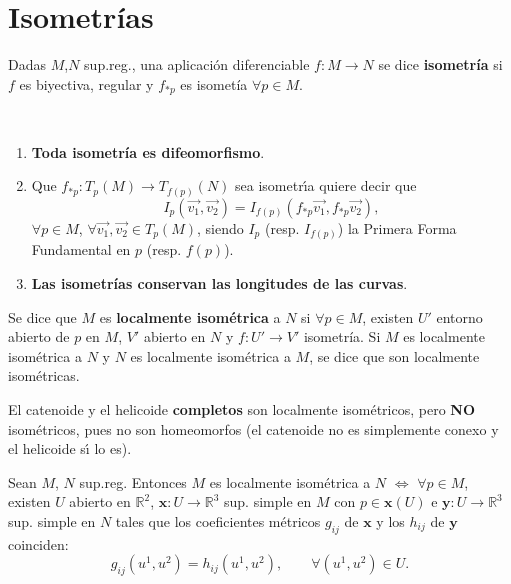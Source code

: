 \documentclass[twoside]{report}
\begin{document}
\section{Isometr\'ias}

\begin{defi}
 Dadas $M$,$N$ sup.reg., una aplicaci\'on diferenciable $f:M \longrightarrow N$ se dice \textbf{isometr\'ia} si $f$ es biyectiva, regular y  $f_{*p}$ es isomet\'ia $\forall p \in M$.
\end{defi}


\begin{nota}

\

\begin{enumerate}
\item \textbf{Toda isometr\'ia es difeomorfismo}.

\item
Que $f_{*p}: T_p (M)\rightarrow T_{f(p)}(N)$ sea isometr\'{\i}a quiere decir que $$I_p (\overrightarrow{v_1},\overrightarrow{v_2}) = I_{f(p)}(f_{*p}\overrightarrow{v_1},f_{*p}\overrightarrow{v_2}),$$ $\forall p \in M$, $\forall \overrightarrow{v_1},\overrightarrow{v_2} \in T_p(M)$, siendo $I_p$ (resp. $I_{f(p)}$) la Primera Forma Fundamental en $p$ (resp. $f(p)$).
\item \textbf{Las isometr\'ias conservan las longitudes de las curvas}.
\end{enumerate}
\end{nota}


\begin{defi}
Se dice que $M$ es \textbf{localmente isom\'etrica}
 a $N$ si $\forall p \in M$, existen $U'$ entorno abierto de $p$ en $M$, $V'$ abierto en $N$ y $f: U' \rightarrow V'$ isometr\'ia. Si $M$ es localmente isom\'etrica a $N$ y $N$ es localmente isom\'etrica a $M$, se dice que son localmente isom\'etricas.
\end{defi}


\begin{ej}
El catenoide y el helicoide \textbf{completos} son localmente isom\'etricos, pero \textbf{NO} isom\'etricos, pues no son homeomorfos (el catenoide no es simplemente conexo y el helicoide s\'{\i} lo es).
\end{ej}

\begin{teorema}
Sean $M$, $N$ sup.reg. Entonces $M$ es localmente isom\'etrica a $N$ $\Leftrightarrow$ $\forall p \in M$, existen $U$ abierto en $\mathbb{R}^2$, $\textbf{x}: U\rightarrow \mathbb{R}^3$ sup. simple en $M$ con $p\in \textbf{x}(U)$ e $\textbf{y}: U\rightarrow \mathbb{R}^3$ sup. simple en $N$ tales que los coeficientes m\'etricos $g_{ij}$ de $\textbf{x}$ y los $h_{ij}$ de $\textbf{y}$ coinciden: $$g_{ij}(u^1,u^2)= h_{ij}(u^1,u^2), \qquad \forall (u^1,u^2) \in U.$$

\end{teorema}
\end{document}
